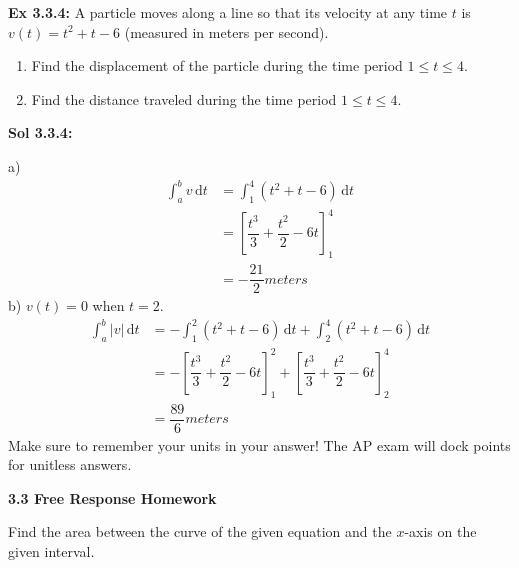 \begin{tcolorbox}[example]
    \textbf{Ex 3.3.4: } A particle moves along a line so that its velocity at any time $t$ is $v(t) = t^2 + t - 6$ (measured in meters per second). \\
    \begin{enumerate}[label=\hspace{11pt}(\alph*), align=left, leftmargin=*, labelsep=0.25em]
        \item Find the displacement of the particle during the time period $1 \leq t \leq 4$. \\
        \item Find the distance traveled during the time period $1 \leq t \leq 4$. \\
    \end{enumerate}
\end{tcolorbox}
\begin{tcolorbox}[solution]
    \textbf{Sol 3.3.4: } \par
    a) \begin{align*}
        \int_a^b v \,\mathrm{d}t & = \int_1^4 \left(t^2 + t - 6\right) \,\mathrm{d}t \\[11pt]
        & = \left[\dfrac{t^3}{3} + \dfrac{t^2}{2} - 6t\right]_1^4 \\[11pt]
        & = \boxed{-\dfrac{21}{2} \si{meters}}
    \end{align*}
    b) $v(t) = 0$ when $t = 2$. \begin{align*}
        \int_a^b |v| \,\mathrm{d}t & = -\int_1^2 \left(t^2 + t - 6\right) \,\mathrm{d}t + \int_2^4 \left(t^2 + t - 6\right) \,\mathrm{d}t \\[11pt]
        & = -\left[\dfrac{t^3}{3} + \dfrac{t^2}{2} - 6t\right]_1^2 + \left[\dfrac{t^3}{3} + \dfrac{t^2}{2} - 6t\right]_2^4 \\[11pt]
        & = \boxed{\dfrac{89}{6} \si{meters}}
    \end{align*}
    Make sure to remember your units in your answer! The AP exam will dock points for unitless answers.
\end{tcolorbox}

\newpage

\textbf{\large{3.3 Free Response Homework}} \par

Find the area between the curve of the given equation and the $x$-axis on the given interval. \par

